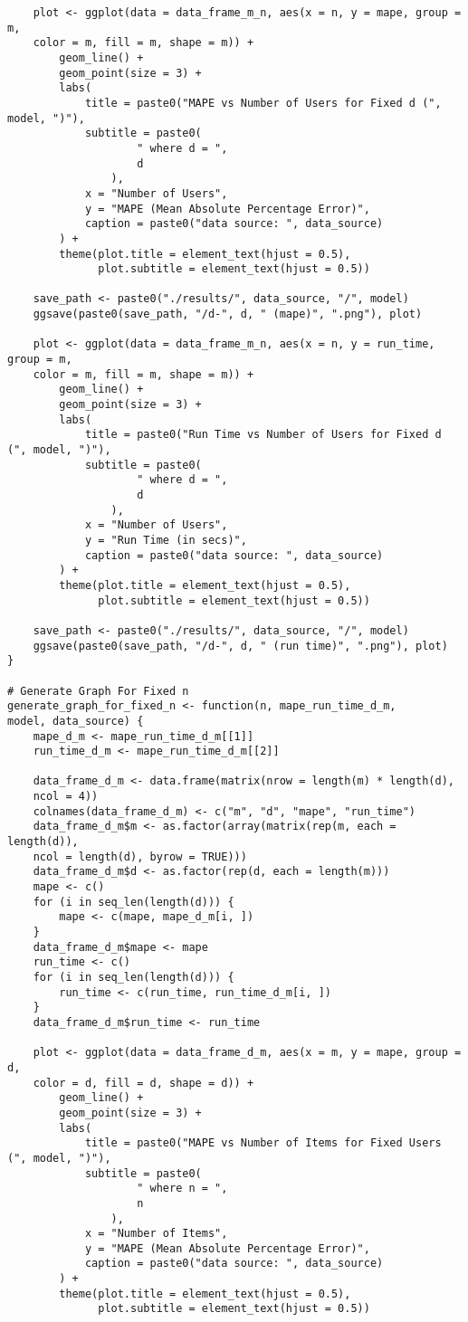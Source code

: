 \documentclass[12pt]{article}
\begin{document}
\begin{singlespace}
\begin{verbatim}
    plot <- ggplot(data = data_frame_m_n, aes(x = n, y = mape, group = m,
    color = m, fill = m, shape = m)) +
        geom_line() +
        geom_point(size = 3) +
        labs(
            title = paste0("MAPE vs Number of Users for Fixed d (", model, ")"),
            subtitle = paste0(
                    " where d = ",
                    d
                ),
            x = "Number of Users",
            y = "MAPE (Mean Absolute Percentage Error)",
            caption = paste0("data source: ", data_source)
        ) +
        theme(plot.title = element_text(hjust = 0.5),
              plot.subtitle = element_text(hjust = 0.5))

    save_path <- paste0("./results/", data_source, "/", model)
    ggsave(paste0(save_path, "/d-", d, " (mape)", ".png"), plot)

    plot <- ggplot(data = data_frame_m_n, aes(x = n, y = run_time, group = m,
    color = m, fill = m, shape = m)) +
        geom_line() +
        geom_point(size = 3) +
        labs(
            title = paste0("Run Time vs Number of Users for Fixed d (", model, ")"),
            subtitle = paste0(
                    " where d = ",
                    d
                ),
            x = "Number of Users",
            y = "Run Time (in secs)",
            caption = paste0("data source: ", data_source)
        ) +
        theme(plot.title = element_text(hjust = 0.5),
              plot.subtitle = element_text(hjust = 0.5))

    save_path <- paste0("./results/", data_source, "/", model)
    ggsave(paste0(save_path, "/d-", d, " (run time)", ".png"), plot)
}

# Generate Graph For Fixed n
generate_graph_for_fixed_n <- function(n, mape_run_time_d_m,
model, data_source) {
    mape_d_m <- mape_run_time_d_m[[1]]
    run_time_d_m <- mape_run_time_d_m[[2]]

    data_frame_d_m <- data.frame(matrix(nrow = length(m) * length(d),
    ncol = 4))
    colnames(data_frame_d_m) <- c("m", "d", "mape", "run_time")
    data_frame_d_m$m <- as.factor(array(matrix(rep(m, each = length(d)),
    ncol = length(d), byrow = TRUE)))
    data_frame_d_m$d <- as.factor(rep(d, each = length(m)))
    mape <- c()
    for (i in seq_len(length(d))) {
        mape <- c(mape, mape_d_m[i, ])
    }
    data_frame_d_m$mape <- mape
    run_time <- c()
    for (i in seq_len(length(d))) {
        run_time <- c(run_time, run_time_d_m[i, ])
    }
    data_frame_d_m$run_time <- run_time

    plot <- ggplot(data = data_frame_d_m, aes(x = m, y = mape, group = d,
    color = d, fill = d, shape = d)) +
        geom_line() +
        geom_point(size = 3) +
        labs(
            title = paste0("MAPE vs Number of Items for Fixed Users (", model, ")"),
            subtitle = paste0(
                    " where n = ",
                    n
                ),
            x = "Number of Items",
            y = "MAPE (Mean Absolute Percentage Error)",
            caption = paste0("data source: ", data_source)
        ) +
        theme(plot.title = element_text(hjust = 0.5),
              plot.subtitle = element_text(hjust = 0.5))


\end{verbatim}
\end{singlespace}
\end{document}
